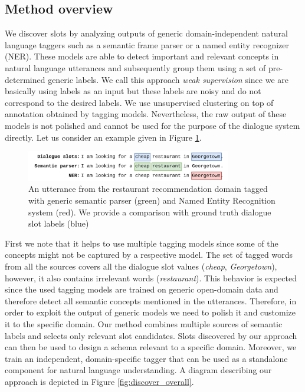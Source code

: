 \subsection{Method overview}
We discover slots by analyzing outputs of generic domain-independent natural language taggers such as a semantic frame parser or a named entity recognizer (NER).
These models are able to detect important and relevant concepts in natural language utterances and subsequently group them using a set of pre-determined generic labels.
We call this approach \emph{weak supervision} since we are basically using labels as an input but these labels are noisy and do not correspond to the desired labels.
We use unsupervised clustering on top of annotation obtained by tagging models.
Nevertheless, the raw output of these models is not polished and cannot be used for the purpose of the dialogue system directly.
Let us consider an example given in Figure \ref{fig:tagged_example}.
\begin{figure}[h]
\centering
    \includegraphics[width=0.8\textwidth]{images/tagging-example.png}
    \caption{An utterance from the restaurant recommendation domain tagged with generic semantic parser (green) and Named Entity Recognition system (red). We provide a comparison with ground truth dialogue slot labels (blue)}
    \label{fig:tagged_example}
\end{figure}
First we note that it helps to use multiple tagging models since some of the concepts might not be captured by a respective model.
The set of tagged words from all the sources covers all the dialogue slot values (\emph{cheap}, \emph{Georgetown}), however, it also contains irrelevant words (\emph{restaurant}).
This behavior is expected since the used tagging models are trained on generic open-domain data and therefore detect all semantic concepts mentioned in the utterances.
Therefore, in order to exploit the output of generic models we need to polish it and customize it to the specific domain.
Our method combines multiple sources of semantic labels and selects only relevant slot candidates.
Slots discovered by our approach can then be used to design a schema relevant to a specific domain.
Moreover, we train an independent, domain-specific tagger that can be used as a standalone component for natural language understanding.
A diagram describing our approach is depicted in Figure \ref{fig:discover_overall}.
